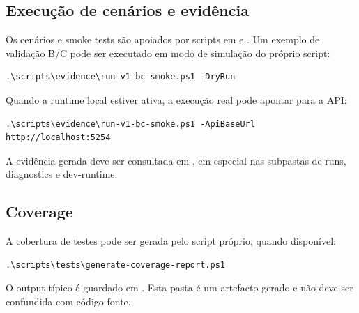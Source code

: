\subsection{Execução de cenários e evidência}

Os cenários e smoke tests são apoiados por scripts em  e . Um exemplo de validação B/C pode ser executado em modo de simulação do próprio script:

\begin{verbatim}
.\scripts\evidence\run-v1-bc-smoke.ps1 -DryRun
\end{verbatim}

Quando a runtime local estiver ativa, a execução real pode apontar para a API:

\begin{verbatim}
.\scripts\evidence\run-v1-bc-smoke.ps1 -ApiBaseUrl http://localhost:5254
\end{verbatim}

A evidência gerada deve ser consultada em , em especial nas subpastas de runs, diagnostics e dev-runtime.

\subsection{Coverage}

A cobertura de testes pode ser gerada pelo script próprio, quando disponível:

\begin{verbatim}
.\scripts\tests\generate-coverage-report.ps1
\end{verbatim}

O output típico é guardado em . Esta pasta é um artefacto gerado e não deve ser confundida com código fonte.
